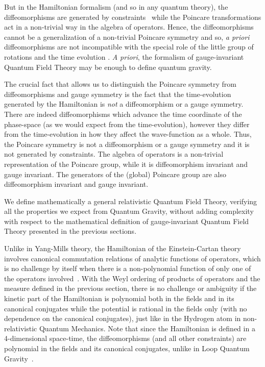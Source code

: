 \documentclass[11pt]{book}
\begin{document}
But in the Hamiltonian formalism (and so in any quantum theory), the
diffeomorphisms are generated by
constraints~\cite{Mukhanov1995On} while the Poincare transformations act in a non-trivial way in
the algebra of operators. Hence, the diffeomorphisms cannot be a
generalization of a non-trivial Poincare symmetry and so, \emph{a
priori} diffeomorphisms are not incompatible with the special role of
the little group of rotations and the time
evolution\cite{Mukhanov1995On} . \emph{A priori}, the formalism of gauge-invariant Quantum Field
Theory may be enough to define quantum gravity.

The crucial fact that allows us to distinguish the Poincare symmetry
from diffeomorphisms and gauge symmetry is the fact that the
time-evolution generated by the Hamiltonian is \emph{not} a
diffeomorphism or a gauge symmetry. There are indeed diffeomorphisms
which advance the time coordinate of the phase-space (as we would expect
from the time-evolution), however they differ from the time-evolution in
how they affect the wave-function as a whole. Thus, the Poincare
symmetry is not a diffeomorphism or a gauge symmetry and it is not
generated by constraints. The algebra of operators is a non-trivial
representation of the Poincare group, while it is diffeomorphism
invariant and gauge invariant. The generators of the (global) Poincare
group are also diffeomorphism invariant and gauge invariant.

We define mathematically a general relativistic Quantum Field Theory,
verifying all the properties we expect from Quantum Gravity, without
adding complexity with respect to the mathematical definition of
gauge-invariant Quantum Field Theory presented in the previous sections.

Unlike in Yang-Mills theory, the Hamiltonian of the Einstein-Cartan
theory involves canonical commutation relations of analytic functions of
operators, which is no challenge by itself when there is a
non-polynomial function of only one of the operators
involved~\cite{Transtrum2005Commutation}. With the Weyl ordering of products of operators and
the measure defined in the previous section, there is no challenge or
ambiguity if the kinetic part of the Hamiltonian is polynomial both in
the fields and in its canonical conjugates while the potential is
rational in the fields only (with no dependence on the canonical
conjugates), just like in the Hydrogen atom in non-relativistic Quantum
Mechanics. Note that since the Hamiltonian is defined in a 4-dimensional
space-time, the diffeomorphisms (and all other constraints) are
polynomial in the fields and its canonical conjugates, unlike in Loop
Quantum Gravity~\cite{Thiemann2008Modern}\cite{Thiemann2020Canonical}.
\end{document}
